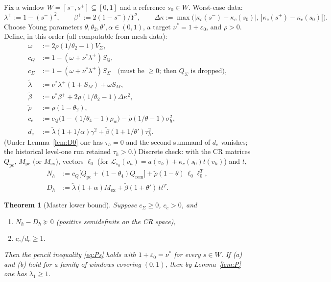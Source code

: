 \documentclass[11pt]{amsart}
\newtheorem{theorem}{Theorem}[section]
\begin{document}
Fix a window $W=[s^-,s^+]\subseteq[0,1]$ and a reference $s_0\in W$.
Worst-case data:
\[
  \lambda^+:=1-(s^-)^2,\qquad
  \beta^+:=2(1-s^-)/Y^2,\qquad
  \Delta\kappa:=\max\bigl(|\kappa_c(s^-)-\kappa_c(s_0)|,\,
  |\kappa_c(s^+)-\kappa_c(s_0)|\bigr).
\]
Choose Young parameters $\theta,\theta_2,\theta',\alpha\in(0,1)$, a target
$\nu^*=1+\varepsilon_0$, and $\rho>0$.  Define, in this order (all
computable from mesh data):
\begin{align*}
  \omega&:=2\rho(1/\theta_2-1)V_\Sigma,\\
  c_Q&:=1-(\omega+\nu^*\lambda^+)S_Q,\\
  c_\Sigma&:=1-(\omega+\nu^*\lambda^+)S_\Sigma
    \quad\text{(must be $\ge 0$; then $Q_\Sigma$ is dropped),}\\
  \tilde\lambda&:=\nu^*\lambda^+(1+S_M)+\omega S_M,\\
  \tilde\beta&:=\nu^*\beta^++2\rho(1/\theta_2-1)\Delta\kappa^2,\\
  \tilde\rho&:=\rho(1-\theta_2),\\
  c_e&:=c_Q\bigl(1-(1/\theta_4-1)\rho_w\bigr)
    -\tilde\rho(1/\theta-1)\sigma_h^2,\\
  d_e&:=\tilde\lambda(1+1/\alpha)\gamma^2
    +\tilde\beta(1+1/\theta')\tau_h^2.
\end{align*}
(Under Lemma~\ref{lem:D0} one has $\tau_h=0$ and the second summand of
$d_e$ vanishes; the historical level-one run retained $\tau_h>0$.)
Discrete check: with the CR matrices $Q_{\mathrm{pc}}$, $M_{\mathrm{pc}}$
(or $M_{\mathrm{ex}}$), vectors $\ell_0$ (for
$\mathcal{L}_{s_0}(v_h)=a(v_h)+\kappa_c(s_0)t(v_h)$) and $t$,
\begin{align*}
  N_h&:=c_Q\bigl[Q_{\mathrm{pc}}+(1-\theta_4)Q_{\mathrm{rem}}\bigr]
    +\tilde\rho(1-\theta)\,\ell_0\ell_0^T,\\
  D_h&:=\tilde\lambda(1+\alpha)M_{\mathrm{ex}}
    +\tilde\beta(1+\theta')\,tt^T.
\end{align*}

\begin{theorem}[Master lower bound]\label{thm:G1}
Suppose $c_\Sigma\ge 0$, $c_e>0$, and
\begin{enumerate}
\item[(a)] $N_h-D_h\succeq 0$ (positive semidefinite on the CR space),
\item[(b)] $c_e/d_e\ge 1$.
\end{enumerate}
Then the pencil inequality \eqref{eq:Ps} holds with $1+\varepsilon_0=\nu^*$
for every $s\in W$.  If (a) and (b) hold for a family of windows covering
$(0,1)$, then by Lemma~\ref{lem:P} one has $\lambda_1\ge 1$.
\end{theorem}
\end{document}
